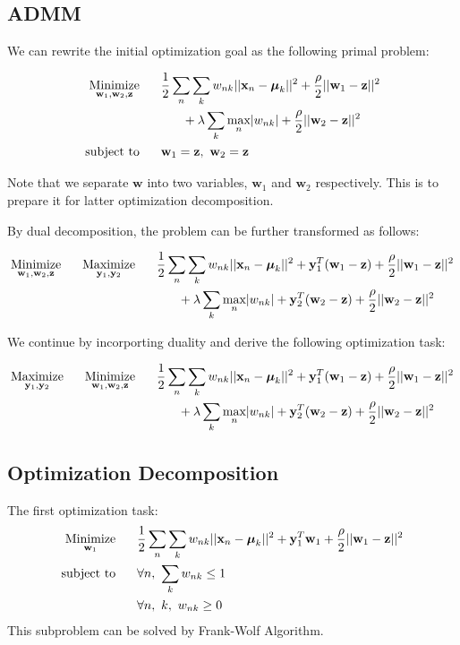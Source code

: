 \documentclass{article} %
\newcommand{\LTwoNorm}[1]{||#1||^{2}}
\newcommand{\sumn}{\sum_{n}}
\newcommand{\sumk}{\sum_{k}}
\newcommand{\wnk}{w_{nk}}
\newcommand{\wone}{\mathbf{w}_1}
\newcommand{\wtwo}{\mathbf{w}_2}
\newcommand{\w}{\mathbf{w}}
\newcommand{\xn}{\mathbf{x}_n}
\newcommand{\muk}{\boldsymbol{\mu}_k}
\newcommand{\maxn}{ \underset{n}{\text{max}} }
\newcommand{\yone}{\mathbf{y}_1}
\newcommand{\ytwo}{\mathbf{y}_2}
\newcommand{\z}{\mathbf{z}}
\newcommand{\quadraterm}[1]{\frac{\rho}{2}\LTwoNorm{\w_{#1}-\z}}
\newcommand{\dualterm}[1]{\mathbf{y}_{#1}^{T}(\w_{#1}-\z)}
\newcommand{\minimize}[1]{ \underset{#1}{\text{Minimize}} }
\newcommand{\maximize}[1]{ \underset{#1}{\text{Maximize}} }
\newcommand{\subjectto}{ \text{subject to} }
\newcommand{\hs}{\hspace*{0.6cm}}
\begin{document}
\subsection{ADMM}

We can rewrite the initial optimization goal as the following primal problem:

 \begin{align}
  \minimize{\wone, \wtwo, \z}
  \hs & \frac{1}{2} \sumn \sumk \wnk \LTwoNorm{\xn - \muk}  %
    + \quadraterm{1} \nonumber \\
    & \hs + \lambda \sumk \maxn | \wnk |
    + \quadraterm{2}
        \\ %
  \subjectto
  \hs & \w_{1} = \z,\ \w_{2} = \z
 \end{align}

 Note that we separate $\w$ into two variables, $\wone$ and $\wtwo$
 respectively. This is to prepare it for latter optimization decomposition.

By dual decomposition, the problem can be further transformed as follows:

 \begin{align}
     \minimize{\wone, \wtwo, \z} \hs  \maximize{\yone, \ytwo}
   \hs & \frac{1}{2} \sumn \sumk \wnk \LTwoNorm{\xn - \muk}  %
   + \dualterm{1} + \quadraterm{1} \nonumber \\
    & \hs + \lambda \sumk \maxn | \wnk |  %
   + \dualterm{2} + \quadraterm{2}
 \end{align}

 We continue by incorporting duality and derive the following optimization
 task:

  \begin{align}
     \maximize{\yone, \ytwo} \hs  \minimize{\wone, \wtwo, \z}
   \hs & \frac{1}{2} \sumn \sumk \wnk \LTwoNorm{\xn - \muk}  %
   + \dualterm{1} + \quadraterm{1} \nonumber \\
    & \hs + \lambda \sumk \maxn | \wnk |  %
   + \dualterm{2} + \quadraterm{2}
 \end{align}

 \subsection{Optimization Decomposition} \label{separate}
\newcommand{\mutw}[1]{\mathbf{y}_{#1}^{T} \w_{#1}}

The first optimization task:
  \begin{align}
   \minimize{\wone}
   \hs & \frac{1}{2} \sumn \sumk \wnk \LTwoNorm{\xn - \muk}  %
   + \mutw{1} + \quadraterm{1} \\
   \subjectto
   \hs & \forall n,\ \sumk \wnk \leq 1 \\
   \hs & \forall n,\ k,\ \wnk \geq 0
 \end{align}
 This subproblem can be solved by Frank-Wolf Algorithm. 
\end{document}
